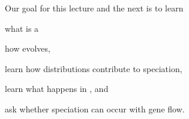 \documentclass[t]{beamer}
\begin{document}

\begin{frame}{Our goal for this lecture and the next is to learn}
	
	\hangpara what is a 

	\hangpara how  evolves,
	
	\hangpara learn how  distributions contribute to speciation,
	
	\hangpara learn what happens in , and
	
	
	\hangpara ask whether speciation can occur with gene flow.
	
\end{frame}
%
%
%
%
%
%
%
%
%
%		
%
%	
%		
%
%
%
%
%
\end{document}
